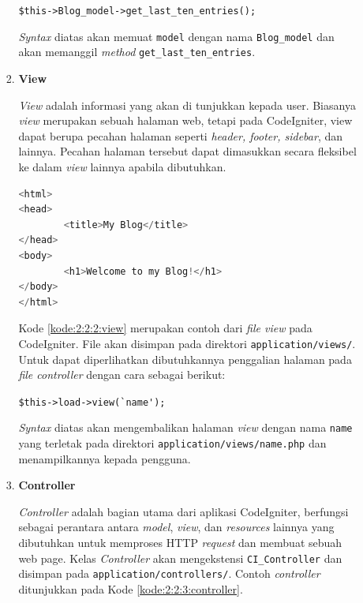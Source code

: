 \documentclass[a4paper,twoside]{article}
\begin{document}
\begin{enumerate}
\begin{enumerate}
\begin{enumerate}
			                  \begin{center}
				                  \verb|$this->Blog_model->get_last_ten_entries();|
			                  \end{center}

			                  \textit{Syntax} diatas akan memuat \verb|model| dengan nama \verb|Blog_model| dan akan memanggil \textit{method} \verb|get_last_ten_entries|.

			            \item \textbf{View}
			                  \label{sub:2:2:2:View}

			                  \textit{View} adalah informasi yang akan di tunjukkan kepada user. Biasanya \textit{view} merupakan sebuah halaman web, tetapi pada CodeIgniter, view dapat berupa pecahan halaman seperti \textit{header, footer, sidebar}, dan lainnya. Pecahan halaman tersebut dapat dimasukkan secara fleksibel ke dalam \textit{view} lainnya apabila dibutuhkan.

			                  \begin{lstlisting}[language=php, caption={Contoh \textit{view}}, label={kode:2:2:2:view}]
<html>
<head>
        <title>My Blog</title>
</head>
<body>
        <h1>Welcome to my Blog!</h1>
</body>
</html>
					\end{lstlisting}

			                  Kode \ref{kode:2:2:2:view} merupakan contoh dari \textit{file view} pada CodeIgniter. File akan disimpan pada direktori \verb|application/views/|. Untuk dapat diperlihatkan dibutuhkannya penggalian halaman pada \textit{file controller} dengan cara sebagai berikut:

			                  \begin{center}
				                  \verb|$this->load->view(`name');|
			                  \end{center}

			                  \textit{Syntax} diatas akan mengembalikan halaman \textit{view} dengan nama \verb|name| yang terletak pada direktori \verb|application/views/name.php| dan menampilkannya kepada pengguna.

			            \item \textbf{Controller}
			                  \label{sub:2:2:3:Controller}

			                  \textit{Controller} adalah bagian utama dari aplikasi CodeIgniter, berfungsi sebagai perantara antara \textit{model}, \textit{view}, dan \textit{resources} lainnya yang dibutuhkan untuk memproses HTTP \textit{request} dan membuat sebuah web page. Kelas \textit{Controller} akan mengekstensi \verb|CI_Controller| dan disimpan pada \verb|application/controllers/|. Contoh \textit{controller} ditunjukkan pada Kode \ref{kode:2:2:3:controller}.


\end{enumerate}
\end{enumerate}
\end{enumerate}
\end{document}
